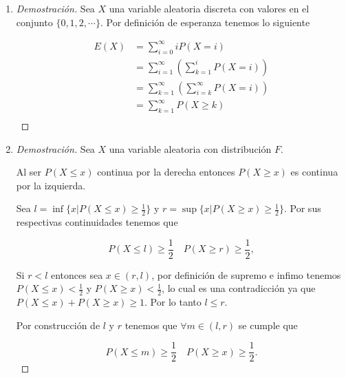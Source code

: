 \documentclass[letterpaper]{article}
\theoremstyle{definition}
\theoremstyle{lemathm}
\theoremstyle{lemademthm}
\begin{document}
\begin{enumerate}
\begin{enumerate}
		\end{enumerate}
		
		\item 
		
		\begin{proof}[Demostración]
			
			Sea $X$ una variable aleatoria discreta con valores en el conjunto $\{0,1,2,\cdots\}$. Por definición de esperanza tenemos lo siguiente

			\begin{align*}
				E(X) &= \sum_{i=0}^\infty iP(X=i)\\
				&= \sum_{i=1}^\infty \left(\sum_{k=1}^i P(X=i)\right)\\
				&= \sum_{k=1}^\infty \left(\sum_{i=k}^\infty P(X=i)\right)\\
				&= \sum_{k=1}^\infty P(X \geq k)\\
			\end{align*}
		
		\end{proof}
		
		\item
		
		\begin{proof}[Demostración]
			
			Sea $X$ una variable aleatoria con distribución $F$.

			Al ser $P(X \leq x)$ continua por la derecha entonces $P(X \geq x)$ es continua por la izquierda.
			
			Sea $l = \inf\{x | P(X \leq x) \geq \frac{1}{2}\}$ y $r = \sup\{x | P(X \geq x) \geq \frac{1}{2}\}$. Por sus respectivas continuidades tenemos que
			
			\[P(X \leq l) \geq \frac{1}{2} \quad P(X \geq r) \geq \frac{1}{2},\]
			
			Si $r < l$ entonces sea $x \in (r,l)$, por definición de supremo e infimo tenemos $P(X \leq x) < \frac{1}{2}$ y $P(X \geq x) < \frac{1}{2}$, lo cual es una contradicción ya que $P(X \leq x) + P(X \geq x) \geq 1$. Por lo tanto $l \leq r$.
			
			Por construcción de $l$ y $r$ tenemos que $\forall m \in (l,r)$ se cumple que
			
			\[P(X \leq m) \geq \frac{1}{2} \quad P(X \geq x) \geq \frac{1}{2}.\]
		
		\end{proof}
		
    \end{enumerate}

	
\end{document}
